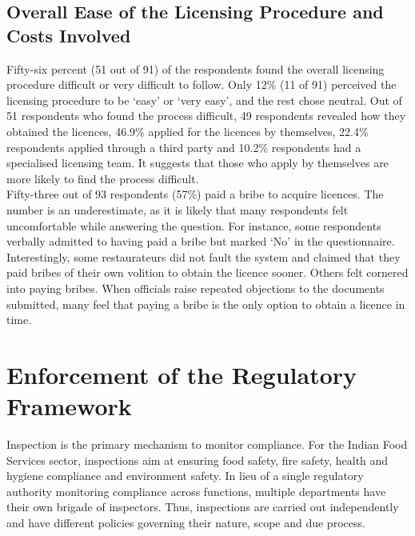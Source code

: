 \documentclass[a4paper, 12pt, twoside]{article}
\begin{document}
		\subsection{Overall Ease of the Licensing Procedure and Costs Involved}
		Fifty-six percent (51 out of 91) of the respondents found the overall licensing procedure difficult or very difficult to follow. Only 12\% (11 of 91) perceived the licensing procedure to be ‘easy’ or ‘very easy’, and the rest chose neutral. Out of 51 respondents 
who found the process difficult, 49 respondents revealed how they obtained the licences, 46.9\% applied for the licences by themselves, 22.4\% respondents applied through a third party and 10.2\% respondents had a specialised licensing team. It suggests that 
those who apply by themselves are more likely to find the process difficult.\\
		
		Fifty-three out of 93 respondents (57\%) paid a bribe to acquire licences. The number is an underestimate, as it is likely that many respondents felt uncomfortable while answering the question. For instance, some respondents verbally admitted to having 
paid a bribe but marked ‘No’ in the questionnaire.\\
		
		Interestingly, some restaurateurs did not fault the system and claimed that they paid bribes of their own volition to obtain the licence sooner. Others felt cornered into paying bribes. When officials raise repeated objections to the documents submitted, 
many feel that paying a bribe is the only option to obtain a licence in time.
		
		

	
		\section{Enforcement of the Regulatory Framework}
		\label{sec:2}
		
		Inspection is the primary mechanism to monitor compliance. For the Indian Food Services sector, inspections aim at ensuring food safety, fire safety, health and hygiene compliance and environment safety. In lieu of a single regulatory authority 
monitoring compliance across functions, multiple departments have their own brigade of inspectors. Thus, inspections are carried out independently and have different policies governing their nature, scope and due process.\\
		
\end{document}
